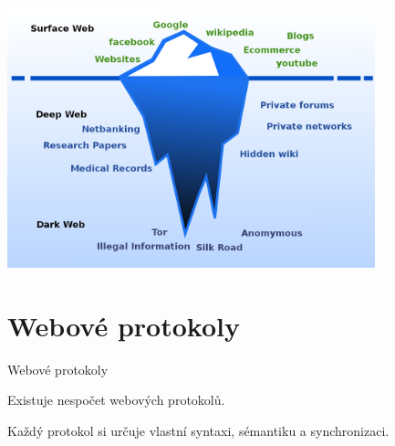 \documentclass[aspectratio=1610]{beamer}
\begin{document}
\begin{frame}
    \begin{center}
        \includegraphics[width=0.8\textwidth]{img/dwdwwww.jpg}
    \end{center}
\end{frame}



\section{Webové protokoly}
\begin{frame}{Webové protokoly}
    \begin{cardTiny}
        \begin{center}
            Existuje nespočet webových protokolů.

            Každý protokol si určuje vlastní syntaxi, sémantiku a synchronizaci.
        \end{center}
    \end{cardTiny}
\end{frame}
\end{document}
